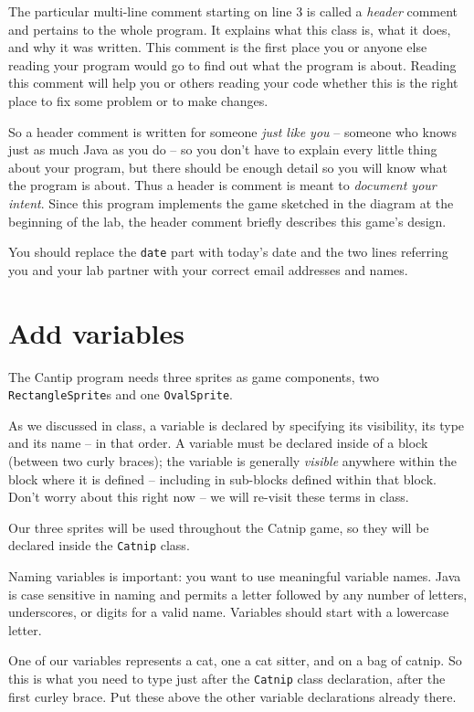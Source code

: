 \documentclass[12pt]{article}
\newcommand{\fname}[1]{\texttt{#1}}
\newcommand{\code}[1]{\texttt{#1}}
\begin{document}
The particular multi-line comment starting on line 3 is called
a \emph{header} comment and pertains to the whole program.
It explains what this class is, what it does,
and why it was written.
This comment is the first place you
or anyone else reading your program would go
to find out what the program is about.
Reading this comment will help you or others reading your code
whether this is the right place to fix some
problem or to make changes.

So a header comment is written for someone \emph{just like you} --
someone who knows just as much Java as you do --
so you don't have to explain every little thing about your program,
but there should be enough detail so you will know
what the program is about.
Thus a header is comment is meant to \emph{document your intent}.
Since this program implements the game sketched in the diagram
at the beginning of the lab,
the header comment briefly describes this game's design.

You should replace the \fname{date} part with today's date
and the two lines referring you and your lab partner
with your correct email addresses and names.

\section*{Add variables}

The Cantip program needs three sprites as game components,
two \code{RectangleSprite}s and one \code{OvalSprite}.

As we discussed in class,
a variable is declared by specifying its visibility,
its type and its name -- in that order.
A variable must be declared inside of a block (between two curly braces);
the variable is generally \emph{visible} anywhere
within the block where it is defined --
including in sub-blocks defined within that block.
Don't worry about this right now -- we will re-visit these terms in class.

Our three sprites will be used throughout the Catnip game,
so they will be declared inside the \verb.Catnip. class.

Naming variables is important: you
want to use meaningful variable names. Java is case sensitive in
naming and permits a letter followed by
any number of letters, underscores, or digits for a valid name.
Variables should start with a lowercase letter.

One of our variables represents a cat, one
a cat sitter, and on a bag of catnip.
So this is what you need to type
just after the \verb.Catnip. class declaration,
after the first curley brace.
Put these above the other variable declarations already there.
\end{document}
